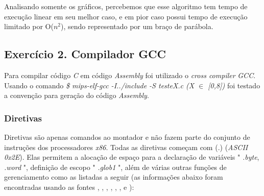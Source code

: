 \documentclass[12pt]{article}
\begin{document}
Analisando somente os gráficos, percebemos que esse algoritmo tem tempo de execução linear em seu melhor caso, e em pior caso possui tempo de execução limitado por O(\(n^2\)), sendo representado por um braço de parábola.

\subsection{Exercício 2. Compilador GCC}
\label{subsec:comp}

Para compilar código \textit{C} em código \textit{Assembly} foi utilizado o \textit{cross compiler} \cite{MIPS} \textit{GCC}. Usando o comando \textit{\$ mips-elf-gcc -I../include -S testeX.c (X $\in$ [0,8])} foi testado a convenção para geração do código \textit{Assembly}.

\subsubsection{Diretivas}
\label{subsubsec:diretivas}

Diretivas são apenas comandos ao montador e não fazem parte do conjunto de instruções dos processadores \textit{x86}. Todas as diretivas começam com (.) (\textit{ASCII 0x2E}). Elas permitem a alocação de espaço para a declaração de variáveis " \textit{.byte}, \textit{.word} ", definição de escopo " \textit{.glob1} ", além de várias outras funções de gerenciamento como as listadas a seguir (as informações abaixo foram encontradas usando as fontes \cite{mips1}, \cite{mips2-1}, \cite{mips2-2}, \cite{mips2-3}, \cite{mips3},
\cite{mips4}, \cite{mips5} e \cite{mips6} ):
\end{document}

